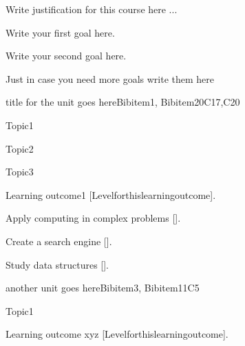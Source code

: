 \begin{syllabus}


\begin{justification}
Write justification for this course here ...
\end{justification}

\begin{goals}
\item Write your first goal here.
\item Write your second goal here.
\item Just in case you need more goals write them here
\end{goals}


\begin{unit}{title for the unit goes here}{}{Bibitem1, Bibitem2}{0}{C17,C20}
\begin{topics}
      \item Topic1
      \item Topic2
      \item Topic3
\end{topics}

\begin{learningoutcomes}
   \item Learning outcome1 [Levelforthislearningoutcome].
   \item Apply computing in complex problems [\Usage].
   \item Create a search engine [\Assessment].
   \item Study data structures [\Familiarity].
\end{learningoutcomes}
\end{unit}

\begin{unit}{another unit goes here}{}{Bibitem3, Bibitem1}{1}{C5}
\begin{topics}
      \item Topic1
\end{topics}

\begin{learningoutcomes}
      \item Learning outcome xyz [Levelforthislearningoutcome].
\end{learningoutcomes}
\end{unit}

\begin{coursebibliography}
\end{coursebibliography}

\end{syllabus}
